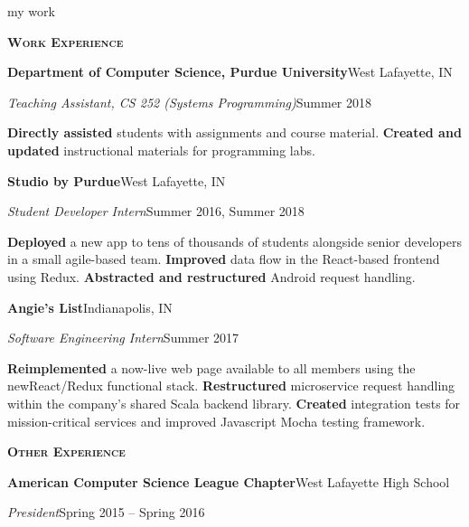\documentclass[11pt]{article}
\newcommand{\sectionfont}{\Large\scshape\bfseries\color{cg505green}}
\newcommand{\impact}[1]{\textcolor{cg505green}{\nohyphens{#1}}}
\begin{document}
\begin{minipage}[t]{0.67\textwidth}
  {\Huge\color{black} my work \phantom{me}}

  \vspace{10pt}

  {\sectionfont Work Experience}

  \textbf{Department of Computer Science, Purdue University}\hfill West Lafayette, IN
  \begin{adjustwidth}{10pt}{}
    \emph{Teaching Assistant, CS 252 (Systems Programming)}\hfill Summer 2018

    \textbf{\impact{Directly assisted}} students with assignments and course material.
    \textbf{Created and updated} instructional materials for programming labs.
  \end{adjustwidth}

  \textbf{Studio by Purdue}\hfill West Lafayette, IN
  \begin{adjustwidth}{10pt}{}
    \emph{Student Developer Intern}\hfill Summer 2016, Summer 2018

    \impact{\textbf{Deployed} a new app to tens of thousands} of students alongside senior developers in a small agile-based team.
    \textbf{Improved} data flow in the React-based frontend using Redux.
    \textbf{Abstracted and restructured} Android request handling.
  \end{adjustwidth}

  \textbf{Angie's List}\hfill Indianapolis, IN
  \begin{adjustwidth}{10pt}{}
    \emph{Software Engineering Intern}\hfill Summer 2017

    \textbf{Reimplemented} a \impact{now-live web page} available to all members using the new\break React/Redux functional stack.
    \textbf{Restructured} \impact{microservice request handling} within the company's shared Scala backend library.
    \textbf{Created} integration tests for mission-critical services and improved Javascript Mocha testing framework.
  \end{adjustwidth}

  \vspace{10pt}

  {\sectionfont Other Experience}

  \textbf{American Computer Science League Chapter}\hfill West Lafayette High School
  \begin{adjustwidth}{10pt}{}
    \emph{President}\hfill Spring 2015 -- Spring 2016


\end{adjustwidth}
\end{minipage}
\end{document}

